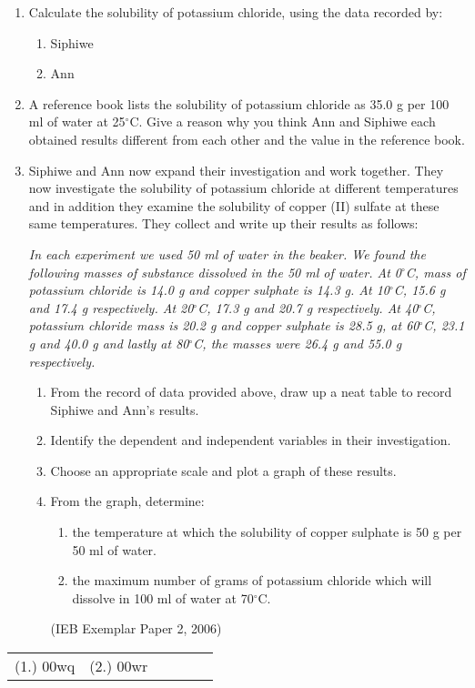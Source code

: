 {\begin{enumerate}
\begin{enumerate}
\item{Calculate the solubility of potassium chloride, using the data recorded by:}
\begin{enumerate}
\item{Siphiwe}
\item{Ann}
\end{enumerate}


\item{A reference book lists the solubility of potassium chloride as 35.0 g per 100 ml of water at 25$^{\circ}$C. Give a reason why you think Ann and Siphiwe each obtained results different from each other and the value in the reference book.}

\item{Siphiwe and Ann now expand their investigation and work together. They now investigate the solubility of potassium chloride at different temperatures and in addition they examine the solubility of copper (II) sulfate at these same temperatures. They collect and write up their results as follows:}

\textit{In each experiment we used 50 ml of water in the beaker. We found the following masses of substance dissolved  in the 50 ml of water. At 0$^{\circ}$C, mass of potassium chloride is 14.0 g and copper sulphate is 14.3 g. At 10$^{\circ}$C, 15.6 g and 17.4 g respectively. At 20$^{\circ}$C, 17.3 g and 20.7 g respectively. At 40$^{\circ}$C, potassium chloride mass is 20.2 g and copper sulphate is 28.5 g, at 60$^{\circ}$C, 23.1 g and 40.0 g and lastly at 80$^{\circ}$C, the masses were 26.4 g and 55.0 g respectively.}

\begin{enumerate}
\item{From the record of data provided above, draw up a neat table to record Siphiwe and Ann's results.}
\item{Identify the dependent and independent variables in their investigation.}
\item{Choose an appropriate scale and plot a graph of these results.}
\item{From the graph, determine:}
\begin{enumerate}
\item{the temperature at which the solubility of copper sulphate is 50 g per 50 ml of water.}
\item{the maximum number of grams of potassium chloride which will dissolve in 100 ml of water at 70$^{\circ}$C.}
\end{enumerate}
(IEB Exemplar Paper 2, 2006)
\end{enumerate}
\end{enumerate}
\end{enumerate}
\practiceinfo

\begin{tabular}[h]{cccccc}
(1.) 00wq & (2.) 00wr & 
 \end{tabular}
}

